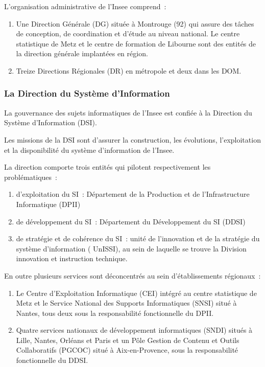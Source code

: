 L'organisation administrative de l'Insee comprend~:
\begin{enumerate}
    \item Une Direction Générale (DG) située à Montrouge (92) qui assure des tâches de conception, de coordination et d'étude au niveau national. Le centre statistique de Metz et le centre de formation de Libourne sont des entités de la direction générale implantées en région.
    \item Treize Directions Régionales (DR) en métropole et deux dans les DOM.
\end{enumerate}

\subsubsection*{La Direction du Système d'Information}

La gouvernance des sujets informatiques de l’Insee est confiée à la Direction du Système d'Information (DSI). 
\newline

Les missions de la DSI sont d’assurer la construction, les évolutions, l'exploitation et la disponibilité du système d'information de l'Insee.
\newline

La direction comporte trois entités qui pilotent respectivement les problématiques~:
\begin{enumerate}
    \item d'exploitation du SI~: Département de la Production et de l'Infrastructure Informatique (DPII)
    \item de développement du SI~: Département du Développement du SI (DDSI)
    \item de stratégie et de cohérence du SI~: unité de l'innovation et de la stratégie du système d'information ( UnISSI), au sein de laquelle se trouve la Division innovation et instruction technique.
    \newline
\end{enumerate}

En outre plusieurs services sont déconcentrés au sein d’établissements régionaux~:
\begin{enumerate}
    \item  Le Centre d’Exploitation Informatique (CEI) intégré au centre statistique de Metz et le Service National des Supports Informatiques (SNSI) situé à Nantes, tous deux sous la responsabilité fonctionnelle du DPII.
    \item Quatre services nationaux de développement informatiques (SNDI) situés à Lille, Nantes, Orléans et Paris et un Pôle Gestion de Contenu et Outils Collaboratifs (PGCOC) situé à Aix-en-Provence, sous la responsabilité fonctionnelle du DDSI.
\end{enumerate}

